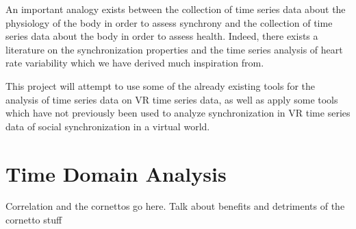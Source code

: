 \documentclass[12pt]{article}
\begin{document}
An important analogy exists between the collection of time series data about the physiology of the body in order to assess synchrony and the collection of time series data about the body in order to assess health. Indeed, there exists a literature on the synchronization properties and the time series analysis of heart rate variability which we have derived much inspiration from. %




This project will attempt to use some of the already existing tools for the analysis of time series data on VR time series data, as well as apply some tools which have not previously been used to analyze synchronization in VR time series data of social synchronization in a virtual world.


\section{Time Domain Analysis}



Correlation and the cornettos go here. Talk about benefits and detriments of the cornetto stuff
\end{document}
